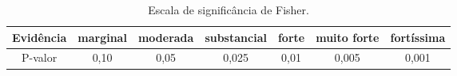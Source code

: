 \begin{table}[htb]
\caption{\label{p_valor} Escala de significância de Fisher.}
    \centering
    \begin{tabular}{c|cccccc}
    \toprule
    Evidência & marginal & moderada & substancial & forte & muito forte & fortíssima\\
    \midrule
        P-valor & 0,10 & 0,05 & 0,025 & 0,01 & 0,005 & 0,001\\
    \bottomrule
    \end{tabular}
\end{table}

